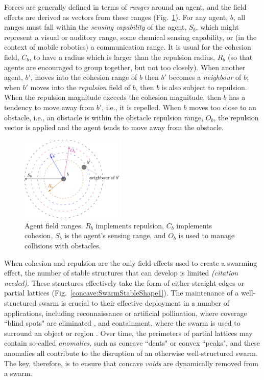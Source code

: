 \documentclass[letterpaper]{article}
\begin{document}
Forces are generally defined in terms of {\em ranges} around an agent, and the field effects are derived as vectors from these ranges (Fig.~\ref{methods:FieldEffects}). For any agent, $b$, all ranges must fall within the {\it sensing capability} of the agent, $S_b$, which might represent a visual or auditory range, some chemical sensing capability, or (in the context of mobile robotics) a communication range. 
It is usual for the cohesion field, $C_b$, to have a radius which is larger than the repulsion radius, $R_b$ (so that agents are encouraged to group together, but not too closely). When another  agent, $b'$, moves into the cohesion range of $b$  then $b'$ becomes a {\it neighbour} of $b$; when $b'$ moves into the {\it repulsion} field of $b$, then $b$ is also subject to repulsion. When the repulsion magnitude exceeds the cohesion magnitude, then $b$ has a tendency to move away from $b'$, i.e., it is repelled. When $b$ moves too close to an obstacle, i.e., an obstacle is within the obstacle repulsion range, $O_b$, the repulsion vector is applied and the agent tends to move away from the obstacle.

\begin{figure}
\begin{center}
\includegraphics[width=5cm]{figures/stableswarm}
\end{center}
\caption{Agent field ranges. $R_b$ implements repulsion, $C_b$ implements cohesion, $S_b$ is the agent's sensing range, and $O_b$ is used to manage collisions with obstacles. \label{methods:FieldEffects}}
\end{figure}

When cohesion and repulsion are the only field effects used to create a swarming effect, the number of stable structures that can develop is limited {\it (citation needed)}. These structures effectively take the form of either straight edges or partial lattices (Fig.~\ref{concave:SwarmStableShape1}). The maintenance of a well-structured swarm is crucial to their effective deployment in a number of applications, including reconnaissance or artificial pollination, where coverage ``blind spots" are eliminated \cite{elamvazhuthi2015optimal}, and containment, where the swarm is used to surround an object or region \cite{cao2012distributed}.  Over time, the perimeters of partial lattices may contain so-called {\it anomalies}, such as concave ``dents" or convex ``peaks", and these anomalies all contribute to the disruption of an otherwise well-structured swarm. The key, therefore, is to ensure that concave {\it voids} are dynamically removed from a swarm.
\end{document}
